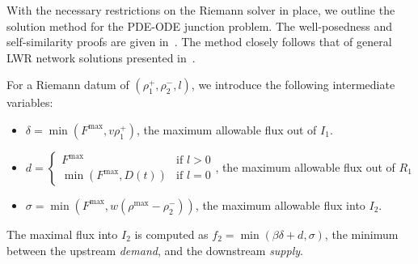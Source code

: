 With the necessary restrictions on the Riemann solver in place, we outline the solution method for the PDE-ODE junction problem. The well-posedness and self-similarity proofs are given in~\cite{delle2014pde}. The method closely follows that of general LWR network solutions presented in~\cite{garavello2006traffic}.

For a Riemann datum of $\left(\rho_1^+, \rho_2^-, l\right)$, we introduce the following intermediate variables:

\begin{itemize}
	\item $\delta = \min\left(F^{\max}, v \rho_1^+\right)$, the maximum allowable flux out of $I_1$.
	\item $d =
	\begin{cases}
	F^{\max} & \text{if } l > 0 \\
	\min\left(F^{\max}, D\left(t\right)\right) & \text{if } l = 0
	\end{cases}$, the maximum allowable flux out of $R_1$
	\item $\sigma = \min\left(F^{\max}, w \left(\rho^{\max} - \rho_2^-\right)\right)$, the maximum allowable flux into $I_2$.
\end{itemize}

The maximal flux into $I_2$ is computed as $f_2 = \min\left(\beta\delta + d, \sigma\right)$, the minimum between the upstream \emph{demand}, and the downstream \emph{supply}.

